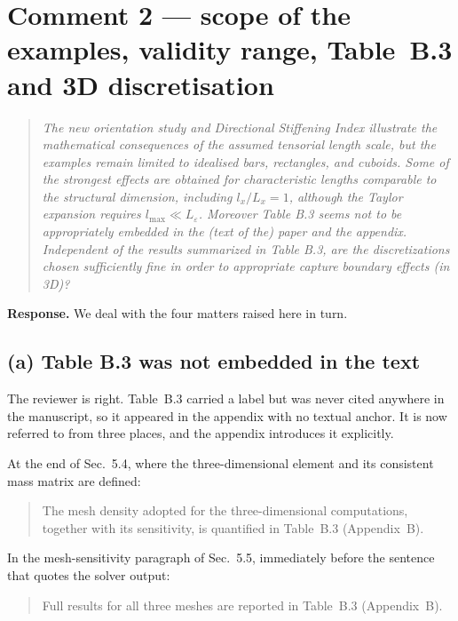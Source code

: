 \documentclass[12pt,a4paper]{article}
\begin{document}
\section*{Comment 2 --- scope of the examples, validity range, Table~B.3 and 3D discretisation}

\begin{quote}\small\itshape
The new orientation study and Directional Stiffening Index illustrate the mathematical consequences of the assumed tensorial length scale, but the examples remain limited to idealised bars, rectangles, and cuboids. Some of the strongest effects are obtained for characteristic lengths comparable to the structural dimension, including $l_x/L_x = 1$, although the Taylor expansion requires $l_{\max} \ll L_\varepsilon$. Moreover Table B.3 seems not to be appropriately embedded in the (text of the) paper and the appendix. Independent of the results summarized in Table B.3, are the discretizations chosen sufficiently fine in order to appropriate capture boundary effects (in 3D)?
\end{quote}

\textbf{Response.} We deal with the four matters raised here in turn.

\subsection*{(a) Table B.3 was not embedded in the text}

The reviewer is right. Table~B.3 carried a label but was never cited anywhere in the manuscript, so it appeared in the appendix with no textual anchor. It is now referred to from three places, and the appendix introduces it explicitly.

At the end of Sec.~5.4, where the three-dimensional element and its consistent mass matrix are defined:

\begin{quote}\small
The mesh density adopted for the three-dimensional computations,
together with its sensitivity, is quantified in
Table~B.3 (Appendix~B).
\end{quote}

\noindent In the mesh-sensitivity paragraph of Sec.~5.5, immediately before the sentence that quotes the solver output:

\begin{quote}\small
Full results for all three meshes are reported in
Table~B.3 (Appendix~B). 
\end{quote}
\end{document}

